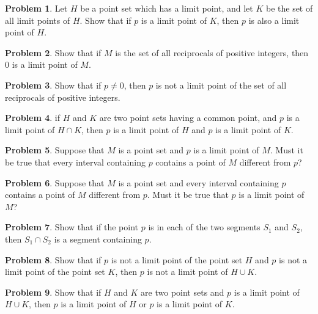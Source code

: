 \documentclass{article}
\theoremstyle{definition}
\newtheorem{problem}{Problem}
\begin{document}
\begin{problem}
Let $H$ be a point set which has a limit point, and let $K$ be the set of all limit points of $H$. Show that if $p$ is a limit point of $K$, then $p$ is also a limit point of $H$.
\end{problem}

\begin{problem}
Show that if $M$ is the set of all reciprocals of positive integers, then $0$ is a limit point of $M$.
\end{problem}

\begin{problem}
Show that if $p \neq 0$, then $p$ is not a limit point of the set of all reciprocals of positive integers.
\end{problem}

\begin{problem}
if $H$ and $K$ are two point sets having a common point, and $p$ is a limit point of $H \cap K$, then $p$ is a limit point of $H$ and $p$ is a limit point of $K$.
\end{problem}

\begin{problem}
Suppose that $M$ is a point set and $p$ is a limit point of $M$. Must it be true that every interval containing $p$ contains a point of $M$ different from $p$?
\end{problem}

\begin{problem}
Suppose that $M$ is a point set and every interval containing $p$ contains a point of $M$ different from $p$. Must it be true that $p$ is a limit point of $M$?
\end{problem}

\begin{problem}
Show that if the point $p$ is in each of the two segments $S_1$ and $S_2$, then $S_1 \cap S_2$ is a segment containing $p$.
\end{problem}

\begin{problem}
Show that if $p$ is not a limit point of the point set $H$ and $p$ is not a limit point of the point set $K$, then $p$ is not a limit point of $H \cup K$.
\end{problem}

\begin{problem}
Show that if $H$ and $K$ are two point sets and $p$ is a limit point of $H \cup K$, then $p$ is a limit point of $H$ or $p$ is a limit point of $K$.
\end{problem}
\end{document}
